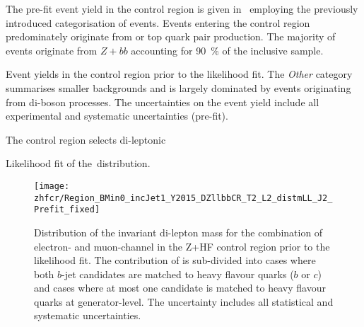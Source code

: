 The pre-fit event yield in the \ZHF control region is given
in~ employing the previously introduced
categorisation of \Zjets events. Events entering the control region
predominately originate from \ZHF or top quark pair production.
The majority of \ZHF events originate from $Z + bb$ accounting for
\SI{90}{\percent} of the inclusive sample.

\begin{table}[htbp]
  \centering

  

  \caption{Event yields in the \ZHF control region prior to the
    likelihood fit. The \emph{Other} category summarises smaller
    backgrounds and is largely dominated by events originating from
    di-boson processes. The uncertainties on the event yield include
    all experimental and systematic uncertainties (pre-fit).}
  \label{tab:zcr_prefit_yields}
\end{table}

The \ZHF control region selects di-leptonic \ttbar



Likelihood fit of the~\mll distribution.


\begin{figure}[htbp]
  \centering

  \texttt{[image: zhfcr/Region\_BMin0\_incJet1\_Y2015\_DZllbbCR\_T2\_L2\_distmLL\_J2\_Prefit\_fixed]}

  \caption{Distribution of the invariant di-lepton mass for the
    combination of electron- and muon-channel in the Z+HF control
    region prior to the likelihood fit. The contribution of \Zjets is
    sub-divided into cases where both $b$-jet candidates are matched
    to heavy flavour quarks ($b$ or $c$) and cases where at most one
    candidate is matched to heavy flavour quarks at
    generator-level. The uncertainty includes all statistical and
    systematic uncertainties.}
  \label{fig:zcr_mll_prefit}
\end{figure}



